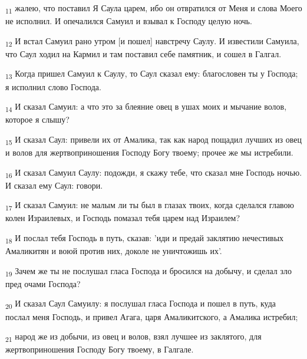\begin{tcolorbox}
\textsubscript{11} жалею, что поставил Я Саула царем, ибо он отвратился от Меня и слова Моего не исполнил. И опечалился Самуил и взывал к Господу целую ночь.
\end{tcolorbox}
\begin{tcolorbox}
\textsubscript{12} И встал Самуил рано утром [и пошел] навстречу Саулу. И известили Самуила, что Саул ходил на Кармил и там поставил себе памятник, и сошел в Галгал.
\end{tcolorbox}
\begin{tcolorbox}
\textsubscript{13} Когда пришел Самуил к Саулу, то Саул сказал ему: благословен ты у Господа; я исполнил слово Господа.
\end{tcolorbox}
\begin{tcolorbox}
\textsubscript{14} И сказал Самуил: а что это за блеяние овец в ушах моих и мычание волов, которое я слышу?
\end{tcolorbox}
\begin{tcolorbox}
\textsubscript{15} И сказал Саул: привели их от Амалика, так как народ пощадил лучших из овец и волов для жертвоприношения Господу Богу твоему; прочее же мы истребили.
\end{tcolorbox}
\begin{tcolorbox}
\textsubscript{16} И сказал Самуил Саулу: подожди, я скажу тебе, что сказал мне Господь ночью. И сказал ему Саул: говори.
\end{tcolorbox}
\begin{tcolorbox}
\textsubscript{17} И сказал Самуил: не малым ли ты был в глазах твоих, когда сделался главою колен Израилевых, и Господь помазал тебя царем над Израилем?
\end{tcolorbox}
\begin{tcolorbox}
\textsubscript{18} И послал тебя Господь в путь, сказав: 'иди и предай заклятию нечестивых Амаликитян и воюй против них, доколе не уничтожишь их'.
\end{tcolorbox}
\begin{tcolorbox}
\textsubscript{19} Зачем же ты не послушал гласа Господа и бросился на добычу, и сделал зло пред очами Господа?
\end{tcolorbox}
\begin{tcolorbox}
\textsubscript{20} И сказал Саул Самуилу: я послушал гласа Господа и пошел в путь, куда послал меня Господь, и привел Агага, царя Амаликитского, а Амалика истребил;
\end{tcolorbox}
\begin{tcolorbox}
\textsubscript{21} народ же из добычи, из овец и волов, взял лучшее из заклятого, для жертвоприношения Господу Богу твоему, в Галгале.
\end{tcolorbox}
